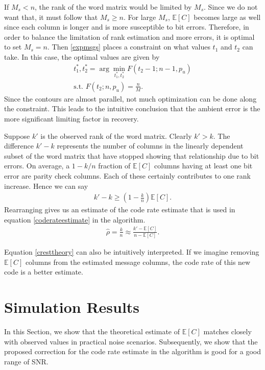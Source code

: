 \documentclass[conference]{IEEEtran}
\begin{document}
If $M_s < n$, the rank of the word matrix would be limited by $M_s$. Since we do not want that, it must follow that $M_s \geq n$. For large $M_s$, $\mathbb{E}[C]$ becomes large as well since each column is longer and is more susceptible to bit errors. Therefore, in order to balance the limitation of rank estimation and more errors, it is optimal to set $M_s = n$. Then \eqref{expmsgs} places a constraint on what values $t_1$ and $t_2$ can take. In this case, the optimal values are given by
\begin{align}
    t_1^*, t_2^* =  \arg \min_{t_1^*, t_2^*} F(t_2-1; n-1, p_u) \\ \label{contours}
    \textrm{s.t. } F(t_2; n, p_u) = \frac{n}{M}.
\end{align}
Since the contours are almost parallel, not much optimization can be done along the constraint. This leads to the intuitive conclusion that the ambient error is the more significant limiting factor in recovery.

Suppose $k'$ is the observed rank of the word matrix. Clearly $k' > k$. The difference $k'-k$ represents the number of columns in the linearly dependent subset of the word matrix that have stopped showing that relationship due to bit errors. On average, a $1-k/n$ fraction of $\mathbb{E}[C]$ columns having at least one bit error are parity check columns. Each of these certainly contributes to one rank increase. Hence we can say
\begin{align*}
    k' - k \geq \left(1-\frac{k}{n}\right) \mathbb{E}[C].
\end{align*}
Rearranging gives us an estimate of the code rate estimate that is used in equation \eqref{coderateestimate} in the algorithm.
\begin{align}\label{cresttheory}
    \hat{\rho} = \frac{k}{n} \approx \frac{k'-\mathbb{E}[C]}{n - \mathbb{E}[C]}.
\end{align}


Equation \eqref{cresttheory} can also be intuitively interpreted. If we imagine removing $\mathbb{E}[C]$ columns from the estimated message columns, the code rate of this new code is a better estimate.

\section{Simulation Results}
In this Section, we show that the theoretical estimate of $\mathbb{E}[C]$ matches closely with observed values in practical noise scenarios. Subsequently, we show that the proposed correction for the code rate estimate in the algorithm is good for a good range of SNR.
\end{document}
